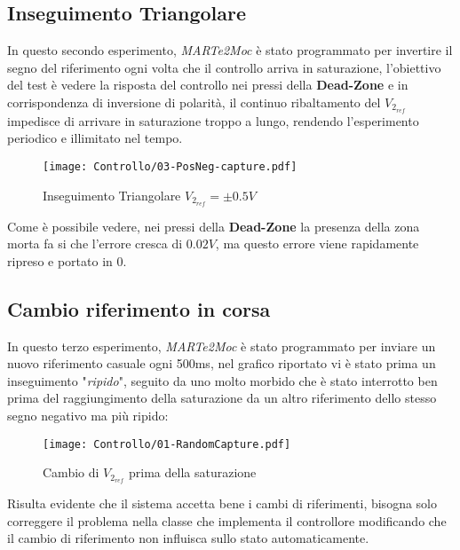 \subsection{Inseguimento Triangolare}
In questo secondo esperimento, \textit{MARTe2Moc} è stato programmato per invertire il segno del riferimento ogni volta che il controllo arriva in saturazione, l'obiettivo del test è vedere la risposta del controllo nei pressi della \textbf{Dead-Zone} e in corrispondenza di inversione di polarità, il continuo ribaltamento del $ V_{2_{ref}} $ impedisce di arrivare in saturazione troppo a lungo, rendendo l'esperimento periodico e illimitato nel tempo.\vspace{-2mm}
\begin{figure}[H]
	\centering
	\caption[Inseguimento Triangolare $ V_{2_{ref}}=\pm0.5V $]{Inseguimento Triangolare $ V_{2_{ref}}=\pm0.5V $}
	\texttt{[image: Controllo/03-PosNeg-capture.pdf]}
\end{figure}\vspace{-8mm}
\noindent
Come è possibile vedere, nei pressi della \textbf{Dead-Zone} la presenza della zona morta fa si che l'errore cresca di $ 0.02V $, ma questo errore viene rapidamente ripreso e portato in 0.\\

\newpage

\subsection{Cambio riferimento in corsa}
In questo terzo esperimento, \textit{MARTe2Moc} è stato programmato per inviare un nuovo riferimento casuale ogni 500ms, nel grafico riportato vi è stato prima un inseguimento "\textit{ripido}", seguito da uno molto morbido che è stato interrotto ben prima del raggiungimento della saturazione da un altro riferimento dello stesso segno negativo ma più ripido:\vspace{-2mm}
\begin{figure}[H]
	\centering
	\caption[Cambio di $ V_{2_{ref}} $ prima della saturazione]{Cambio di $ V_{2_{ref}} $ prima della saturazione}
	\texttt{[image: Controllo/01-RandomCapture.pdf]}
\end{figure}\vspace{-8mm}
\noindent
Risulta evidente che il sistema accetta bene i cambi di riferimenti, bisogna solo correggere il problema nella classe che implementa il controllore modificando che il cambio di riferimento non influisca sullo stato automaticamente.